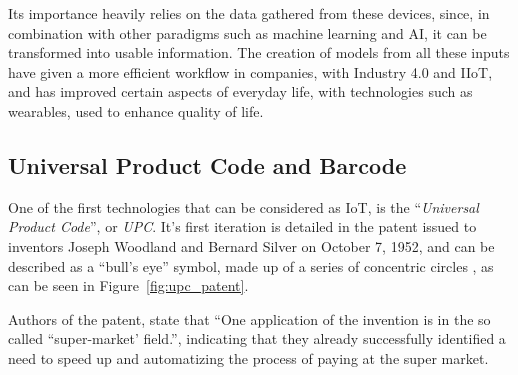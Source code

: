 	
	Its importance heavily relies on the data gathered from these devices, since, in combination with other paradigms such as machine learning and AI, it can be transformed into usable information.
	The creation of models from all these inputs have given a more efficient workflow in companies, with Industry 4.0 and IIoT, and has improved certain aspects of everyday life, with technologies such as wearables, used to enhance quality of life.

		
	\subsection{Universal Product Code and Barcode}

		One of the first technologies that can be considered as IoT, is the ``\textit{Universal Product Code}'', or \textit{UPC}.
		It's first iteration is detailed in the patent issued to inventors Joseph Woodland and Bernard Silver on October 7, 1952, and can be described as a ``bull's eye'' symbol, made up of a series of concentric circles \cite{upc_patent}, as can be seen in Figure~\ref{fig:upc_patent}.
		
%			
		
		Authors of the patent, state  that ``One application of the invention is in the so called ``super-market' field.'', indicating that they already successfully identified a need to speed up and automatizing the process of paying at the super market.
		
